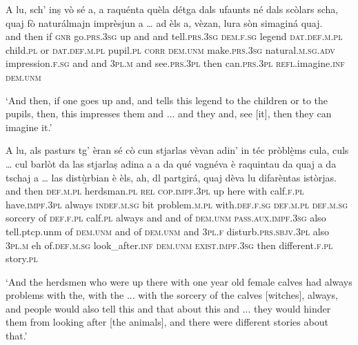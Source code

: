 \begin{linenumbers}
	\gll A lu, sch’ inṣ vò sé a, a raquénta quèla détga dals ufaunts né dals scòlars scha, quaj fò naturálmajn imprèsjun a … ad èls a, vèzan, lura sòn simaginá quaj.\\
and then if \textsc{gnr} go.\textsc{prs.3sg} up and and tell.\textsc{prs.3sg} \textsc{dem.f.sg} legend \textsc{dat.def.m.pl} child.\textsc{pl} or \textsc{dat.def.m.pl} pupil.\textsc{pl} \textsc{corr} \textsc{dem.unm} make.\textsc{prs.3sg} natural.\textsc{m.sg.adv} impression.\textsc{f.sg} and {} and \textsc{3pl.m} and see.\textsc{prs.3pl} then can.\textsc{prs.3pl} \textsc{refl}.imagine.\textsc{inf} \textsc{dem.unm}\\
\end{linenumbers}
\medskip
\glt `And then, if one goes up and, and tells this legend to the children or to the pupils, then, this impresses them and ... and they and, see [it], then they can imagine it.'
\medskip

\begin{linenumbers}
	\gll A lu, als pasturs tg’ èran sé cò cun stjarlas vèvan adin’ in téc pròblè̱ms cula, culs … cul barlòt da las stjarlaṣ\footnotemark{} adina a a da qué vagnéva è raquintau da quaj a da tschaj a … las distù̱rbian è èls, ah, dl partgirá, quaj dèva lu difarèntas istòrjas.\\
and then \textsc{def.m.pl} herdsman.\textsc{pl} \textsc{rel} \textsc{cop.impf.3pl} up here with calf.\textsc{f.pl} have.\textsc{impf.3pl} always \textsc{indef.m.sg} bit problem.\textsc{m.pl} with.\textsc{def.f.sg} \textsc{def.m.pl} {} \textsc{def.m.sg} sorcery of \textsc{def.f.pl} calf.\textsc{pl} always and and of \textsc{dem.unm} \textsc{pass.aux.impf.3sg} also tell.ptcp.unm of \textsc{dem.unm} and of \textsc{dem.unm} and {} \textsc{3pl.f} disturb.\textsc{prs.sbjv.3pl} also \textsc{3pl.m} eh of.\textsc{def.m.sg} look\_after.\textsc{inf} \textsc{dem.unm} \textsc{exist.impf.3sg} then different.\textsc{f.pl} story.\textsc{pl} \\
\end{linenumbers}
\medskip
\glt `And the herdsmen who were up there with one year old female calves had always problems with the, with the ... with the sorcery of the calves [witches], always, and people would also tell this and that about this and ... they would hinder them from looking after [the animals], and there were different stories about that.'
\medskip

